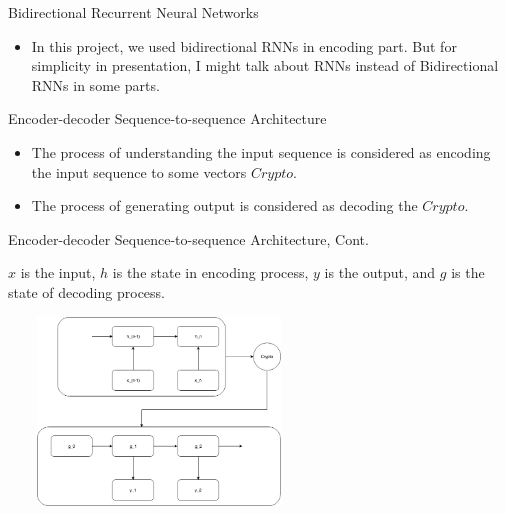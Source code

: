 \documentclass{beamer}
\begin{document}
\begin{frame}{Bidirectional Recurrent Neural Networks}
    \begin{itemize}
        \item In this project, we used bidirectional RNNs in encoding part. But for simplicity in presentation, I might talk about RNNs instead of Bidirectional RNNs in some parts.

    \end{itemize}
\end{frame}

\begin{frame}{Encoder-decoder Sequence-to-sequence Architecture}
\begin{itemize}
    \item The process of understanding the input sequence is considered as encoding the input sequence to some vectors $Crypto$.
    \item The process of generating output is considered as decoding the $Crypto$.
\end{itemize}



\end{frame}

\begin{frame}{Encoder-decoder Sequence-to-sequence Architecture, Cont.}
\begin{examples}
$x$ is the input, $h$ is the state in encoding process, $y$ is the output, and $g$ is the state of decoding process.
\begin{center}
        \includegraphics[width=8cm, height=5cm]{figures/encoderDecoder.png}
    \end{center}
\end{examples}

\end{frame}
\end{document}
